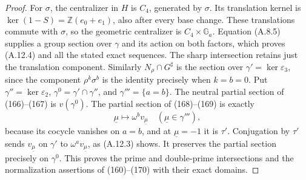 \begin{proof}
For $\sigma$, the centralizer in $H$ is $C_4$, generated by
$\sigma$. Its translation kernel is
$\ker(1-S)=\mathbb Z(e_0+e_1)$, also after every base change.
These translations commute with $\sigma$, so the geometric
centralizer is $C_4\times\mathbb G_a$. Equation (A.8.5) supplies
a group section over $\gamma$ and its action on both factors,
which proves (A.12.4) and all the stated exact sequences. The sharp
intersection retains just the translation component. Similarly
$N_\rho\cap G^\sharp$ is the section over
$\gamma'=\ker\varepsilon_3$, since the component
$\rho^k\sigma^b$ is the identity precisely when $k=b=0$.
Put $\gamma''=\ker\varepsilon_2$, $\gamma^0=\gamma'\cap\gamma''$,
and $\gamma'''=\{a=b\}$. The neutral partial section of (166)--(167)
is $v(\gamma^0)$. The partial section of (168)--(169) is exactly
\[
 \underline\mu\longmapsto\omega^b v_{\underline\mu}
 \quad(\underline\mu\in\gamma'''),
\]
because its cocycle vanishes on $a=b$, and at $\underline\mu=-1$
it is $\tau'$. Conjugation by $\tau'$ sends
$v_{\underline\mu}$ on $\gamma'$ to
$\omega^a v_{\underline\mu}$, as (A.12.3) shows. It preserves
the partial section precisely on $\gamma^0$.
This proves the prime and double-prime intersections and the
normalization assertions of (160)--(170) with their exact domains.
\end{proof}

